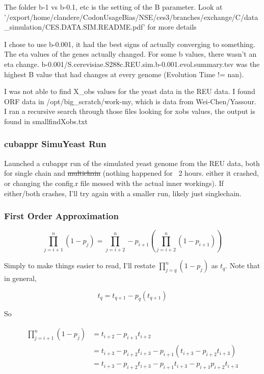 \documentclass[11pt]{article} %
\begin{document}
The folder b-1 vs b-0.1, etc is the setting of the B parameter. Look at '/export/home/clandere/CodonUsageBias/NSE/ces3/branches/exchange/C/data\_simulation/CES.DATA.SIM.README.pdf' for more details

I chose to use b-0.001, it had the best signs of actually converging to something. The eta values of the genes actually changed. For some b values, there wasn't an eta change. b-0.001/S.cerevisiae.S288c.REU.sim.b-0.001.evol.summary.tsv was the highest B value that had changes at every genome (Evolution Time != nan). 

I was not able to find X\_obs values for the yeast data in the REU data. I found ORF data in /opt/big\_scratch/work-my, which is data from Wei-Chen/Yassour. I ran a recursive search through those files looking for xobs values, the output is found in smallfindXobs.txt



\subsubsection{cubappr SimuYeast Run}
Launched a cubappr run of the simulated yeast genome from the REU data, both for single chain and \sout{multichain} (nothing happened for ~2 hours. either it crashed, or changing the config.r file messed with the actual inner workings). If either/both crashes, I'll try again with a smaller run, likely just singlechain.


\subsubsection{First Order Approximation}

$$\prod_{j=i+1}^{n} (1-p_j)= \prod_{j=i+2}^{n} - p_{i+1}\left(\prod_{j=i+2}^{n}(1-p_{i+1})\right)$$

Simply to make things easier to read, I'll restate $\prod_{j=q}^{n} (1-p_j)$ as $t_q$. Note that in general,

$$t_q = t_{q+1} - p_q(t_{q+1})$$

So 

\begin{align*}
	\prod_{j=i+1}^{n} (1-p_j) &= t_{i+2} - p_{i+1}t_{i+2} \\
	&= t_{i+3} - p_{i+2}t_{i+3} - p_{i+1}\left(t_{i+3} - p_{i+2}t_{i+3}\right) \\
	&= t_{i+3} - p_{i+2}t_{i+3} - p_{i+1}t_{i+3} - p_{i+1}p_{i+2}t_{i+3}
\end{align*}
\end{document}
